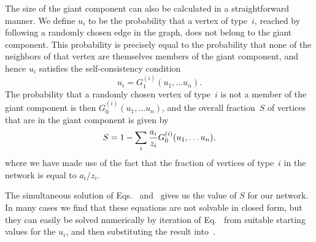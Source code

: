 \documentclass[twocolumn,pre]{revtex4}
\begin{document}
The size of the giant component can also be calculated in a straightforward
manner.  We define $u_i$ to be the probability that a vertex of type~$i$,
reached by following a randomly chosen edge in the graph, does not belong
to the giant component.  This probability is precisely equal to the
probability that none of the neighbors of that vertex are themselves
members of the giant component, and hence $u_i$ satisfies the
self-consistency condition
\begin{equation}
u_i = G_1^{(i)}(u_1,\ldots u_n).
\label{discui}
\end{equation}
The probability that a randomly chosen vertex of type~$i$ is not a member
of the giant component is then $G_0^{(i)}(u_1,\ldots u_n)$, and the overall
fraction~$S$ of vertices that are in the giant component is given by
\begin{equation}
S = 1 - \sum_i {a_i\over z_i} G_0^{(i)}(u_1,\ldots u_n),
\label{discgc}
\end{equation}
where we have made use of the fact that the fraction of vertices of
type~$i$ in the network is equal to $a_i/z_i$.

The simultaneous solution of Eqs.~ and~ gives us
the value of $S$ for our network.  In many cases we find that these
equations are not solvable in closed form, but they can easily be solved
numerically by iteration of Eq.~ from suitable starting values
for the $u_i$, and then substituting the result into~.
\end{document}
